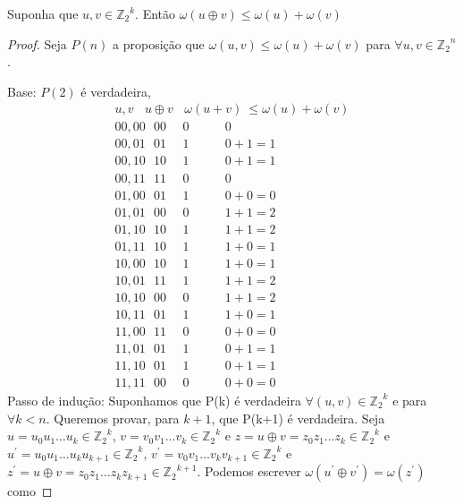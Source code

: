 \begin{proposition} \label{somauns} Suponha que $u, v \in {\mathbb{Z}_2}^k$. Então $\omega(u \oplus v) \leq \omega(u) + \omega(v)$
\end{proposition}

\begin{proof} Seja $P(n)$ a proposição que $\omega(u,v) \leq \omega(u) + \omega(v)$ para $\forall u,v \in {\mathbb{Z}_2}^n$.

Base: $P(2)$ é verdadeira,
$$
\begin{array}{l}
u,v\ \ \ \ u \oplus v\ \ \ \ \omega (u+v)\ \leq \omega(u) + \omega(v)\\
00,00\ \ \ 00\ \ \ \ \ \ 0\ \ \ \ \ \ \ \ \ \ \ \ \  0\\
00,01\ \ \ 01\ \ \ \ \ \ 1\ \ \ \ \ \ \ \ \ \ \ \ \ 0+1=1\\
00,10\ \ \ 10\ \ \ \ \ \ 1\ \ \ \ \ \ \ \ \ \ \ \ \ 0+1=1\\
00,11\ \ \ 11\ \ \ \ \ \ 0\ \ \ \ \ \ \ \ \ \ \ \ \ 0\\
01,00\ \ \ 01\ \ \ \ \ \ 1\ \ \ \ \ \ \ \ \ \ \ \ \ 0+0=0\\
01,01\ \ \ 00\ \ \ \ \ \ 0\ \ \ \ \ \ \ \ \ \ \ \ \ 1+1=2\\
01,10\ \ \ 10\ \ \ \ \ \ 1\ \ \ \ \ \ \ \ \ \ \ \ \ 1+1=2\\
01,11\ \ \ 10\ \ \ \ \ \ 1\ \ \ \ \ \ \ \ \ \ \ \ \ 1+0=1\\
10,00\ \ \ 10\ \ \ \ \ \ 1\ \ \ \ \ \ \ \ \ \ \ \ \ 1+0=1\\
10,01\ \ \ 11\ \ \ \ \ \ 1\ \ \ \ \ \ \ \ \ \ \ \ \ 1+1=2\\
10,10\ \ \ 00\ \ \ \ \ \ 0\ \ \ \ \ \ \ \ \ \ \ \ \ 1+1=2\\
10,11\ \ \ 01\ \ \ \ \ \ 1\ \ \ \ \ \ \ \ \ \ \ \ \ 1+0=1\\
11,00\ \ \ 11\ \ \ \ \ \ 0\ \ \ \ \ \ \ \ \ \ \ \ \ 0+0=0\\
11,01\ \ \ 01\ \ \ \ \ \ 1\ \ \ \ \ \ \ \ \ \ \ \ \ 0+1=1\\
11,10\ \ \ 01\ \ \ \ \ \ 1\ \ \ \ \ \ \ \ \ \ \ \ \ 0+1=1\\
11,11\ \ \ 00\ \ \ \ \ \ 0\ \ \ \ \ \ \ \ \ \ \ \ \ 0+0=0
\end{array}
$$
Passo de indução: Suponhamos que P(k) é verdadeira $\forall (u,v) \in {\mathbb{Z}_2}^k$ e para $\forall k < n$.
Queremos provar, para $k+1$, que P(k+1) é verdadeira. Seja $u=u_0u_1 \ldots u_k \in {\mathbb{Z}_2}^k$, $v=v_0v_1 \ldots v_k \in {\mathbb{Z}_2}^k$ e $z=u \oplus v=z_0z_1 \ldots z_k \in {\mathbb{Z}_2}^k$ e $u^{'}=u_0u_1 \ldots u_ku_{k+1} \in {\mathbb{Z}_2}^k$, $v^{'}=v_0v_1 \ldots v_kv_{k+1} \in {\mathbb{Z}_2}^k$ e $z^{'}=u \oplus v=z_0z_1 \ldots z_kz_{k+1} \in {\mathbb{Z}_2}^{k+1}$. Podemos escrever $\omega (u^{'} \oplus v^{'})=\omega (z^{'})$ como

\end{proof}

